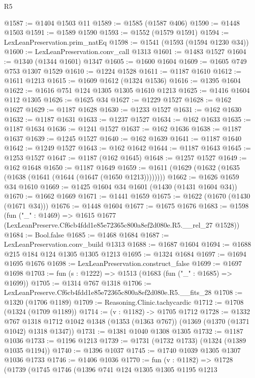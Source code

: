 \begin{lexlean}{R5}
\begin{coremodule}
@1587 := @1404 @1503 @11
@1589 := @1585 (@1587 @406)
@1590 := @1448 @1503
@1591 := @1589 @1590
@1593 := @1552 (@1579 @1591)
@1594 := LexLeanPreservation.prim_natEq
@1598 := @1541 (@1593 (@1594 @1230 @34))
@1600 := LexLeanPreservation.conv_call @1313
@1601 := @1483 @1527
@1604 := @1340 (@1344 @1601) @1347
@1605 := @1600 @1604
@1609 := @1605 @749 @753 @1307 @1529
@1610 := @1224 @1528
@1611 := @1187 @1610
@1612 := @1611 @1213
@1615 := @1609 @1612 (@1324 @1536)
@1616 := @1395 @1604
@1622 := @1616 @751 @124 @1305 @1305 @1610 @1213
@1625 := @1416 @1604 @112 @1305
@1626 := @1625 @34
@1627 := @1229 @1527
@1628 := @162 @1627
@1629 := @1187 @1628
@1630 := @1233 @1527
@1631 := @162 @1630
@1632 := @1187 @1631
@1633 := @1237 @1527
@1634 := @162 @1633
@1635 := @1187 @1634
@1636 := @1241 @1527
@1637 := @162 @1636
@1638 := @1187 @1637
@1639 := @1245 @1527
@1640 := @162 @1639
@1641 := @1187 @1640
@1642 := @1249 @1527
@1643 := @162 @1642
@1644 := @1187 @1643
@1645 := @1253 @1527
@1647 := @1187 (@162 @1645)
@1648 := @1257 @1527
@1649 := @162 @1648
@1650 := @1187 @1649
@1659 := @1611 (@1629 (@1632 (@1635 (@1638 (@1641 (@1644 (@1647 (@1650 @1213))))))))
@1662 := @1626 @1659 @34 @1610
@1669 := @1425 @1604 @34 @1601 (@1430 (@1431 @1604 @34))
@1670 := @1662 @1669
@1671 := @1441 @1659
@1675 := @1622 (@1670 (@1430 (@1671 @34)))
@1676 := @1448 @1604
@1677 := @1675 @1676
@1683 := @1598
    (fun ("_" : @1469) =>
    @1615 @1677 (LexLeanPreserve.Cf6cb4fdd1e85e72365c800a8ef2d080e.R5.__rel_27 @1528))
@1684 := Bool.false
@1685 := @1468 @1684
@1687 := LexLeanPreservation.conv_build @1313
@1688 := @1687 @1604
@1694 := @1688 @215 @184 @124 @1305 @1305 @1213
@1695 := @1324 @1684
@1697 := @1694 @1695 @1676
@1698 := LexLeanPreservation.construct_false
@1699 := @1697 @1698
@1703 := fun (s : @1222) => @1513 (@1683 (fun ("_" : @1685) => @1699))
@1705 := @1314 @767 @1318
@1706 := LexLeanPreserve.Cf6cb4fdd1e85e72365c800a8ef2d080e.R5.__fits_28
@1708 := @1320 (@1706 @1189)
@1709 := Reasoning.Clinic.tachycardic
@1712 := @1708 (@1324 (@1709 @1189))
@1714 := (v : @1182) -> @1705 @1712
@1728 := @1332
    @767
    @1318
    @1712
    @1042
    @1348
    (@1353 (@1363 @767))
    (@1369 (@1370 (@1371 @1042) @1318 @1347))
@1731 := @1381 @1040 @1308 @1305
@1732 := @1187 @1036
@1733 := @1196 @1213
@1739 := @1731 (@1732 @1733) (@1324 (@1389 @1035 @1194))
@1740 := @1396 @1037
@1745 := @1740 @1039 @1305 @1307 @1036 @1733
@1746 := @1406 @1036
@1770 := fun (v : @1182) =>
  @1728
    (@1739
      (@1745
        @1746
        (@1396
          @741
          @124
          @1305
          @1305
          @1195
          @1213

\end{coremodule}
\end{lexlean}
